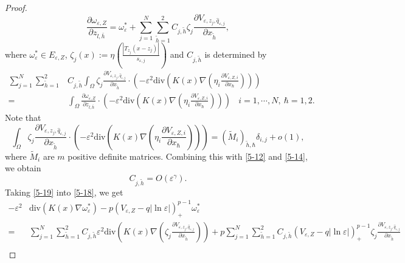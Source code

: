 \documentclass[12pt,reqno]{amsart}
\numberwithin{equation}{section}
\theoremstyle{definition}
\theoremstyle{remark}
\begin{document}
\begin{proof}
\begin{equation}\label{5-19}
\frac{\partial\omega_{\varepsilon,Z}}{\partial z_{l,\bar{h}}}=\omega_{\varepsilon}^*+\sum_{j=1}^N\sum_{\tilde{h}=1}^2C_{j,\tilde{h}}\zeta_j\frac{\partial V_{\varepsilon, z_j, \hat{q}_{\varepsilon,j}}}{\partial x_{\tilde{h}}},
\end{equation}
where $ \omega_{\varepsilon}^*\in E_{\varepsilon,Z} $,  $\zeta_j(x):=\eta\left (\frac{|T_{z_j}\left( x-z_j\right) |}{s_{\varepsilon,j}}\right )$ and $ C_{j,\tilde{h}} $ is determined by
\begin{equation*}
\begin{split}
\sum_{j=1}^N\sum_{\tilde{h}=1}^2&C_{j,\tilde{h}}\int_{\Omega}\zeta_j\frac{\partial V_{\varepsilon, z_j, \hat{q}_{\varepsilon,j}}}{\partial x_{\tilde{h}}}\cdot\left( -\varepsilon^2\text{div}\left( K(x)\nabla\left(\eta_i\frac{\partial V_{\varepsilon,Z,i}}{\partial x_\hbar} \right) \right)\right) \\
=& \int_{\Omega}\frac{\partial\omega_{\varepsilon,Z}}{\partial z_{l,\bar{h}}}\cdot\left( -\varepsilon^2\text{div}\left( K(x)\nabla\left(\eta_i\frac{\partial V_{\varepsilon,Z,i}}{\partial x_\hbar} \right)\right)\right)  \ \ \ \ i=1,\cdots,N,\ \hbar=1,2.
\end{split}
\end{equation*}
Note that
\begin{equation*}
\int_{\Omega}\zeta_j\frac{\partial V_{\varepsilon, z_j, \hat{q}_{\varepsilon,j}}}{\partial x_{\tilde{h}}}\cdot\left( -\varepsilon^2\text{div}\left( K(x)\nabla\left(\eta_i\frac{\partial V_{\varepsilon,Z,i}}{\partial x_\hbar} \right) \right)\right) = (\tilde{M}_i)_{\tilde{h},\hbar}\delta_{i,j}+o(1),
\end{equation*}
where $ \tilde{M}_{i} $ are $ m $ positive definite matrices. Combining this with \eqref{5-12} and \eqref{5-14}, we obtain
\begin{equation}\label{5-20}
C_{j,\tilde{h}}=O\left( \varepsilon^\gamma \right).
\end{equation}
Taking \eqref{5-19} into \eqref{5-18}, we get
\begin{equation}\label{5-21}
\begin{split}
-\varepsilon^2&\text{div}\left( K(x)\nabla  \omega_{\varepsilon}^*\right)-p\left( V_{\varepsilon,Z} -q|\ln\varepsilon|\right)^{p-1}_+\omega_{\varepsilon}^*\\
=&\sum_{j=1}^N\sum_{\tilde{h}=1}^2C_{j,\tilde{h}} \varepsilon^2\text{div}\left( K(x)\nabla \left( \zeta_j\frac{\partial V_{\varepsilon, z_j, \hat{q}_{\varepsilon,j}}}{\partial x_{\tilde{h}}}\right) \right)+ p\sum_{j=1}^N\sum_{\tilde{h}=1}^2C_{j,\tilde{h}}\left( V_{\varepsilon,Z} -q|\ln\varepsilon|\right)^{p-1}_+\zeta_j\frac{\partial V_{\varepsilon, z_j, \hat{q}_{\varepsilon,j}}}{\partial x_{\tilde{h}}}\\

\end{split}
\end{equation}
\end{proof}
\end{document}
